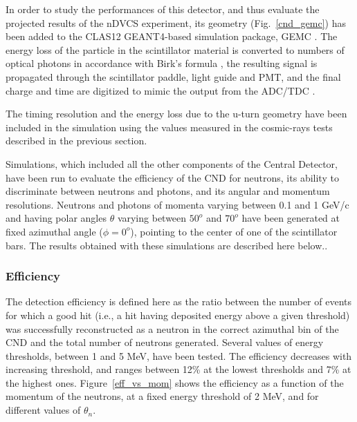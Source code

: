 In order to study the performances of this detector, and thus evaluate the projected results of the nDVCS experiment, its geometry (Fig.~\ref{cnd_gemc}) has been added to the CLAS12 GEANT4-based simulation package, GEMC \cite{mauri}. The energy loss of the particle in the scintillator material is converted to numbers of optical photons in accordance with Birk's formula \cite{birks}, the resulting signal is propagated through the scintillator paddle, light guide and PMT, and the final charge and time are digitized to mimic the output from the ADC/TDC \cite{daria_wiki}.

The timing resolution and the energy loss due to the u-turn geometry have been included in the simulation using the values measured in the cosmic-rays tests described in the previous section. 

Simulations, which included all the other components of the Central Detector, have been run to evaluate the efficiency of the CND for neutrons, its ability to discriminate between neutrons and photons, and its angular and momentum resolutions. Neutrons and photons of momenta varying between 0.1 and 1 GeV/c and having polar angles $\theta$ varying between $50^o$ and $70^o$ have been generated at fixed azimuthal angle ($\phi = 0^o$), pointing to the center of one of the scintillator bars. The results obtained with these simulations are described here below..

\subsubsection{Efficiency}\label{efficiency-section}

 The detection efficiency is defined here as the ratio between the number of events for which a good hit (i.e., a hit having deposited energy above a given threshold) was successfully reconstructed as a neutron in the correct azimuthal bin of the CND and the total number of neutrons generated. 
Several values of energy thresholds, between 1 and 5 MeV, have been tested. 
The efficiency decreases with increasing threshold, and ranges between 12\% at the lowest thresholds and 7\% at the highest ones. 
Figure~\ref{eff_vs_mom} shows the efficiency as a function of the momentum of the neutrons, at a fixed energy threshold of 2 MeV, and for different values of $\theta_n$. 

